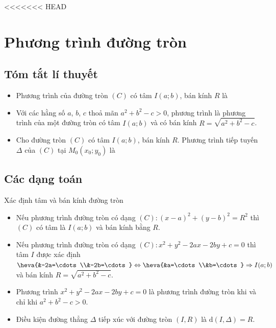 <<<<<<< HEAD
\newpage
\setcounter{dang}{0}
\section{Phương trình đường tròn}
\subsection{Tóm tắt lí thuyết}
\setcounter{ex}{0}
\setcounter{bt}{0}
\begin{itemize}
	\item Phương trình của đường tròn $(C)$ có tâm $I(a;b)$, bán kính $R$ là
	\item Với các hằng số $a$, $b$, $c$ thoả mãn $a^2+b^2-c>0$, phương trình
	là phương trình của một đường tròn có tâm $I(a;b)$ và có bán kính $R=\sqrt{a^2+b^2-c}$.
	\item Cho đường tròn $(C)$ có tâm $I(a;b)$, bán kính $R$. Phương trình tiếp tuyến $\Delta$ của $(C)$ tại $M_0\left(x_0; y_0\right)$ là 
\end{itemize}
\subsection{Các dạng toán}
\begin{dang}{Xác định tâm và bán kính đường tròn}
	\begin{itemize}
		\item Nếu phương trình đường tròn có dạng $(C)\colon \left(x-a\right)^2+\left(y-b\right)^2=R^2$ thì $(C)$ có tâm là $I(a;b)$ và bán kính bằng $R$.
		\item Nếu phương trình đường tròn có dạng $(C)\colon x^2+y^2-2ax-2by+c=0$ thì tâm $I$ được xác định 
		$\heva{&-2a=\cdots\\&-2b=\cdots} \Leftrightarrow \heva{&a=\cdots\\&b=\cdots }\Rightarrow I(a;b)$ và bán kính $R=\sqrt{a^2+b^2-c}$.
	\end{itemize}
	\begin{note}
		\begin{itemize}
			\item Phương trình $x^2+y^2-2ax-2by+c=0$ là phương trình đường tròn khi và chỉ khi $a^2+b^2-c>0$.
			\item Điều kiện đường thẳng $\Delta$ tiếp xúc với đường tròn $(I,R)$ là $\mathrm{d}\left(I,\Delta\right)=R$.
		\end{itemize}
	\end{note}
\end{dang}
